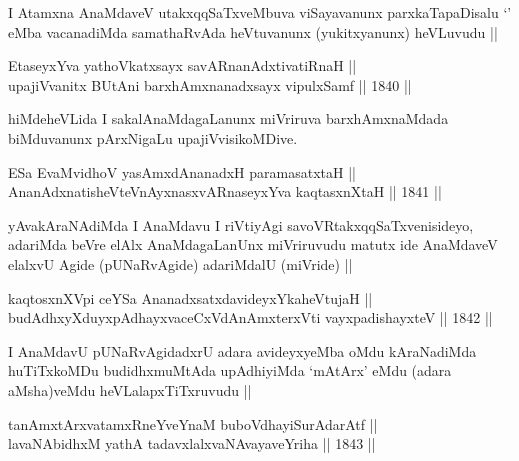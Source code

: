 \begin{artha}
I Atamxna AnaMdaveV utakxqqSaTxveMbuva viSayavanunx parxkaTapaDisalu
`\stext' eMba vacanadiMda samathaRvAda heVtuvanunx (yukitxyanunx)
heVLuvudu ||
\end{artha}

\begin{shl}
EtaseyxYva yathoVkatxsayx savARnanAdxtivatiRnaH || \\
upajiVvanitx BUtAni barxhAmxnanadxsayx vipulxSamf ||  1840 ||  
\end{shl}

\begin{artha}
hiMdeheVLida I sakalAnaMdagaLanunx miVriruva barxhAmxnaMdada
biMduvanunx pArxNigaLu upajiVvisikoMDive.
\end{artha}

\begin{shl}
ESa EvaMvidhoV yasAmxdAnanadxH paramasatxtaH || \\
AnanAdxnatisheVteV\s nAyxnasxvARnaseyxYva kaqtasxnXtaH ||  1841 ||  
\end{shl}

\begin{artha}
yAvakAraNAdiMda I AnaMdavu I riVtiyAgi savoVRtakxqqSaTxvenisideyo,
adariMda beVre elAlx AnaMdagaLanUnx miVriruvudu matutx ide AnaMdaveV
elalxvU Agide (pUNaRvAgide) adariMdalU (miVride) ||
\end{artha}


\begin{shl}
kaqtosxnXV\s pi ceYSa AnanadxsatxdavideyxYkaheVtujaH || \\
budAdhxyXduyxpAdhayxvaceCxVdAnAmxterxVti vayxpadishayxteV ||  1842 ||  
\end{shl}

\begin{artha}
I AnaMdavU pUNaRvAgidadxrU adara avideyxyeMba oMdu kAraNadiMda
huTiTxkoMDu budidhxmuMtAda upAdhiyiMda `mAtArx' eMdu (adara
aMsha)veMdu heVLalapxTiTxruvudu ||
\end{artha}


\begin{shl}
tanAmxtArxvatamxRneYveYnaM buboVdhayiSurAdarAtf || \\
lavaNAbidhxM yathA tadavxlalxvaNAvayaveYriha ||  1843 ||  
\end{shl}

